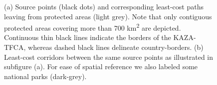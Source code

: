 \documentclass[abstract=on,10pt,a4paper,bibliography=totocnumbered]{scrartcl}
\begin{document}
\begin{figure}[hbtp]
\begin{center}
    \caption{(a) Source points (black dots) and corresponding least-cost paths
    leaving from protected areas (light grey). Note that only contiguous
    protected areas covering more than 700 km\textsuperscript{2} are depicted.
    Continuous thin black lines indicate the borders of the KAZA-TFCA, whereas
    dashed black lines delineate country-borders. (b) Least-cost corridors
    between the same source points as illustrated in subfigure (a). For ease of
    spatial reference we also labeled some national parks (dark-grey).}
    \label{LeastCost}
  \end{center}
\end{figure}
\restoregeometry
\end{document}
